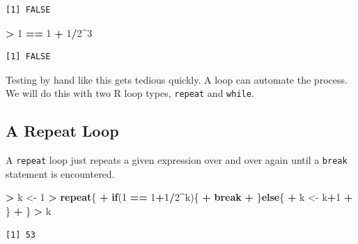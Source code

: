 \documentclass[
]{krantz}
\makeatletter
\newenvironment{Shaded}{\begin{snugshade}}{\end{snugshade}}
\newcommand{\ControlFlowTok}[1]{\textcolor[rgb]{0.27,0.27,0.27}{\textbf{#1}}}
\newcommand{\DecValTok}[1]{\textcolor[rgb]{0.06,0.06,0.06}{#1}}
\newcommand{\NormalTok}[1]{#1}
\newcommand{\OperatorTok}[1]{\textcolor[rgb]{0.43,0.43,0.43}{\textbf{#1}}}
\newcommand{\StringTok}[1]{\textcolor[rgb]{0.5,0.5,0.5}{#1}}
\newenvironment{kframe}{%
\medskip{}
\setlength{\fboxsep}{.8em}
 \def\at@end@of@kframe{}%
 \ifinner\ifhmode%
  \def\at@end@of@kframe{\end{minipage}}%
  \begin{minipage}{\columnwidth}%
 \fi\fi%
 \def\FrameCommand##1{\hskip\@totalleftmargin \hskip-\fboxsep
 \colorbox{shadecolor}{##1}\hskip-\fboxsep
     \hskip-\linewidth \hskip-\@totalleftmargin \hskip\columnwidth}%
 \MakeFramed {\advance\hsize-\width
   \@totalleftmargin\z@ \linewidth\hsize
   \@setminipage}}%
 {\par\unskip\endMakeFramed%
 \at@end@of@kframe}
\renewenvironment{Shaded}{\begin{kframe}}{\end{kframe}}
\makeatother
\begin{document}
\begin{verbatim}
[1] FALSE
\end{verbatim}

\begin{Shaded}
\begin{Highlighting}[]
\OperatorTok{\textgreater{}}\StringTok{ }\DecValTok{1} \OperatorTok{==}\StringTok{ }\DecValTok{1} \OperatorTok{+}\StringTok{ }\DecValTok{1}\OperatorTok{/}\DecValTok{2}\OperatorTok{\^{}}\DecValTok{3}
\end{Highlighting}
\end{Shaded}

\begin{verbatim}
[1] FALSE
\end{verbatim}

Testing by hand like this gets tedious quickly. A loop can automate the process. We will do this with two R loop types, \texttt{repeat} and \texttt{while}.

\hypertarget{a-repeat-loop}{%
\subsection{A Repeat Loop}\label{a-repeat-loop}}

A \texttt{repeat} loop just repeats a given expression over and over again until a \texttt{break} statement is encountered.

\begin{Shaded}
\begin{Highlighting}[]
\OperatorTok{\textgreater{}}\StringTok{ }\NormalTok{k \textless{}{-}}\StringTok{ }\DecValTok{1}
\OperatorTok{\textgreater{}}\StringTok{ }\ControlFlowTok{repeat}\NormalTok{\{}
\OperatorTok{+}\StringTok{     }\ControlFlowTok{if}\NormalTok{(}\DecValTok{1} \OperatorTok{==}\StringTok{ }\DecValTok{1}\OperatorTok{+}\DecValTok{1}\OperatorTok{/}\DecValTok{2}\OperatorTok{\^{}}\NormalTok{k)\{}
\OperatorTok{+}\StringTok{         }\ControlFlowTok{break}
\OperatorTok{+}\StringTok{     }\NormalTok{\}}\ControlFlowTok{else}\NormalTok{\{}
\OperatorTok{+}\StringTok{         }\NormalTok{k \textless{}{-}}\StringTok{ }\NormalTok{k}\OperatorTok{+}\DecValTok{1}
\OperatorTok{+}\StringTok{     }\NormalTok{\}}
\OperatorTok{+}\StringTok{ }\NormalTok{\}}
\OperatorTok{\textgreater{}}\StringTok{ }\NormalTok{k}
\end{Highlighting}
\end{Shaded}

\begin{verbatim}
[1] 53
\end{verbatim}
\end{document}
